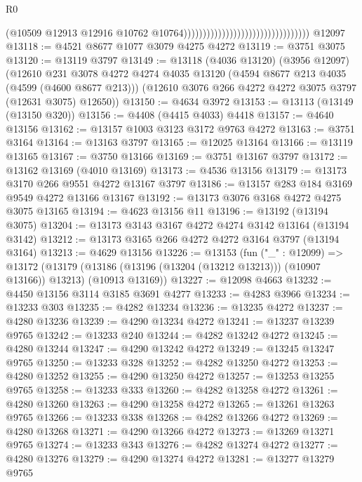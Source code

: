 \begin{lexlean}{R0}
\begin{coremodule}
                                                                    (@10509
                                                                      @12913
                                                                      @12916
                                                                      @10762
                                                                      @10764)))))))))))))))))))))))))))))))))
    @12097
@13118 := @4521 @8677 @1077 @3079 @4275 @4272
@13119 := @3751 @3075
@13120 := @13119 @3797
@13149 := @13118
    (@4036 @13120)
    (@3956 @12097)
    (@12610
      @231
      @3078
      @4272
      @4274
      @4035
      @13120
      (@4594 @8677 @213 @4035 (@4599 (@4600 @8677 @213)))
      (@12610 @3076 @266 @4272 @4272 @3075 @3797 (@12631 @3075) @12650))
@13150 := @4634 @3972
@13153 := @13113 (@13149 (@13150 @320))
@13156 := @4408 (@4415 @4033) @4418
@13157 := @4640 @13156
@13162 := @13157 @1003 @3123 @3172 @9763 @4272
@13163 := @3751 @3164
@13164 := @13163 @3797
@13165 := @12025 @13164
@13166 := @13119 @13165
@13167 := @3750 @13166
@13169 := @3751 @13167 @3797
@13172 := @13162 @13169 (@4010 @13169)
@13173 := @4536 @13156
@13179 := @13173 @3170 @266 @9551 @4272 @13167 @3797
@13186 := @13157 @283 @184 @3169 @9549 @4272 @13166 @13167
@13192 := @13173 @3076 @3168 @4272 @4275 @3075 @13165
@13194 := @4623 @13156 @11
@13196 := @13192 (@13194 @3075)
@13204 := @13173 @3143 @3167 @4272 @4274 @3142 @13164 (@13194 @3142)
@13212 := @13173 @3165 @266 @4272 @4272 @3164 @3797 (@13194 @3164)
@13213 := @4629 @13156
@13226 := @13153
    (fun ("_" : @12099) =>
    @13172
      (@13179 (@13186 (@13196 (@13204 (@13212 @13213))) (@10907 @13166)) @13213)
      (@10913 @13169))
@13227 := @12098 @4663
@13232 := @4450 @13156 @3114 @3185 @3691 @4277
@13233 := @4283 @3966
@13234 := @13233 @303
@13235 := @4282 @13234
@13236 := @13235 @4272
@13237 := @4280 @13236
@13239 := @4290 @13234 @4272
@13241 := @13237 @13239 @9765
@13242 := @13233 @240
@13244 := @4282 @13242 @4272
@13245 := @4280 @13244
@13247 := @4290 @13242 @4272
@13249 := @13245 @13247 @9765
@13250 := @13233 @328
@13252 := @4282 @13250 @4272
@13253 := @4280 @13252
@13255 := @4290 @13250 @4272
@13257 := @13253 @13255 @9765
@13258 := @13233 @333
@13260 := @4282 @13258 @4272
@13261 := @4280 @13260
@13263 := @4290 @13258 @4272
@13265 := @13261 @13263 @9765
@13266 := @13233 @338
@13268 := @4282 @13266 @4272
@13269 := @4280 @13268
@13271 := @4290 @13266 @4272
@13273 := @13269 @13271 @9765
@13274 := @13233 @343
@13276 := @4282 @13274 @4272
@13277 := @4280 @13276
@13279 := @4290 @13274 @4272
@13281 := @13277 @13279 @9765

\end{coremodule}
\end{lexlean}

